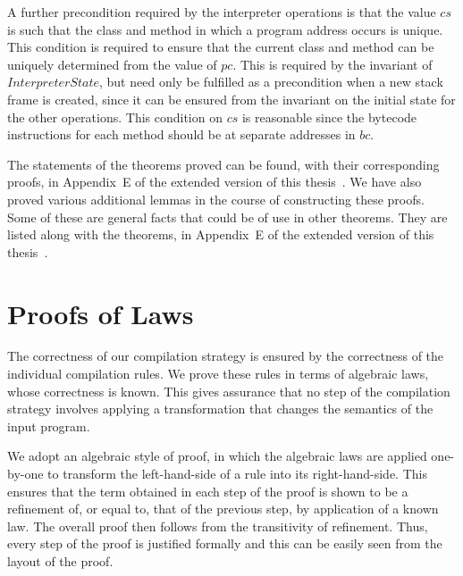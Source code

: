 A further precondition required by the interpreter operations is that
the value $cs$ is such that the class and method in which a program
address occurs is unique.
This condition is required to ensure that the current class and method
can be uniquely determined from the value of $pc$.
This is required by the invariant of $InterpreterState$, but need only
be fulfilled as a precondition when a new stack frame is created,
since it can be ensured from the invariant on the initial state for
the other operations.
This condition on $cs$ is reasonable since the bytecode instructions
for each method should be at separate addresses in $bc$.

The statements of the theorems proved can be found, with their
corresponding proofs, in Appendix~E of the extended version of this
thesis~\cite{baxter2018-extended}.
We have also proved various additional lemmas in the course of
constructing these proofs.
Some of these are general facts that could be of use in other
theorems.
They are listed along with the theorems, in Appendix~E of the extended
version of this thesis~\cite{baxter2018-extended}.

\section{Proofs of Laws}
\label{proofs-of-laws-section}

The correctness of our compilation strategy is ensured by the
correctness of the individual compilation rules.
We prove these rules in terms of algebraic laws, whose correctness is
known.
This gives assurance that no step of the compilation strategy involves
applying a transformation that changes the semantics of the input
program.

We adopt an algebraic style of proof, in which the algebraic laws are
applied one-by-one to transform the left-hand-side of a rule into its
right-hand-side.
This ensures that the term obtained in each step of the proof is shown
to be a refinement of, or equal to, that of the previous step, by
application of a known law.
The overall proof then follows from the transitivity of refinement.
Thus, every step of the proof is justified formally and this can be
easily seen from the layout of the proof.

